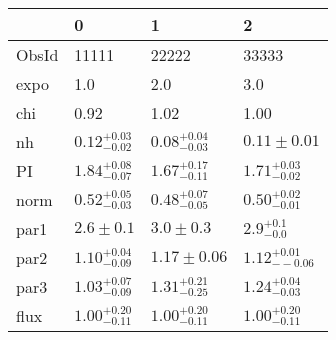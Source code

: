 \begin{tabular}{llll}
\toprule
{} &                       0 &                       1 &                        2 \\
\midrule
ObsId &                   11111 &                   22222 &                    33333 \\
expo  &                     1.0 &                     2.0 &                      3.0 \\
chi   &                    0.92 &                    1.02 &                     1.00 \\
nh    &  $0.12^{+0.03}_{-0.02}$ &  $0.08^{+0.04}_{-0.03}$ &            $0.11\pm0.01$ \\
PI    &  $1.84^{+0.08}_{-0.07}$ &  $1.67^{+0.17}_{-0.11}$ &   $1.71^{+0.03}_{-0.02}$ \\
norm  &  $0.52^{+0.05}_{-0.03}$ &  $0.48^{+0.07}_{-0.05}$ &   $0.50^{+0.02}_{-0.01}$ \\
par1  &             $2.6\pm0.1$ &             $3.0\pm0.3$ &      $2.9^{+0.1}_{-0.0}$ \\
par2  &  $1.10^{+0.04}_{-0.09}$ &           $1.17\pm0.06$ &  $1.12^{+0.01}_{--0.06}$ \\
par3  &  $1.03^{+0.07}_{-0.09}$ &  $1.31^{+0.21}_{-0.25}$ &   $1.24^{+0.04}_{-0.03}$ \\
flux  &  $1.00^{+0.20}_{-0.11}$ &  $1.00^{+0.20}_{-0.11}$ &   $1.00^{+0.20}_{-0.11}$ \\
\bottomrule
\end{tabular}
